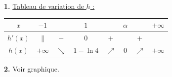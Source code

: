 \documentclass[11pt]{article}
\begin{document}
\textbf{1.} \underline{Tableau de variation de $h$ :}
\begin{center}\renewcommand{\arraystretch}{1.4}
\begin{tabular}{|c|ccccccc|}
\hline
$x$ & $-1$ & & $1$ & & $\alpha$ & & $+\infty$ \\
\hline
$h'(x)$ & $\|$ & $-$ & $0$ & $+$ & & $+$ & \\
\hline
$h(x)$ & $+\infty$ & $\searrow$ & $1 - \ln 4$ & $\nearrow$ & $0$ & $\nearrow$ & $+\infty$ \\
\hline
\end{tabular}
\end{center}

\textbf{2.} Voir graphique.
\end{document}
